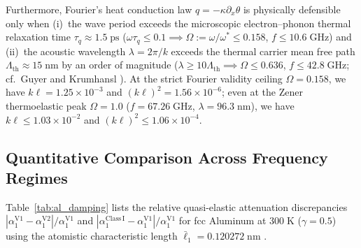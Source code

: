 Furthermore, Fourier's heat conduction law $q = -\kappa\partial_x\theta$ is physically defensible only when (i)~the wave period exceeds the microscopic electron--phonon thermal relaxation time $\tau_q \approx 1.5\;\mathrm{ps}$ ($\omega\tau_q \le 0.1 \implies \Omega := \omega/\omega^* \le 0.158$, $f \le 10.6\;\mathrm{GHz}$) and (ii)~the acoustic wavelength $\lambda = 2\pi/k$ exceeds the thermal carrier mean free path $\Lambda_{\mathrm{th}} \approx 15\;\mathrm{nm}$ by an order of magnitude ($\lambda \ge 10\Lambda_{\mathrm{th}} \implies \Omega \le 0.636$, $f \le 42.8\;\mathrm{GHz}$; cf.\ Guyer and Krumhansl \cite{GuyerKrumhansl1966}). At the strict Fourier validity ceiling $\Omega = 0.158$, we have $k\ell = 1.25 \times 10^{-3}$ and $(k\ell)^2 = 1.56 \times 10^{-6}$; even at the Zener thermoelastic peak $\Omega = 1.0$ ($f = 67.26\;\mathrm{GHz}$, $\lambda = 96.3\;\mathrm{nm}$), we have $k\ell \le 1.03 \times 10^{-2}$ and $(k\ell)^2 \le 1.06 \times 10^{-4}$.

\subsection{Quantitative Comparison Across Frequency Regimes}\label{subsec:quantitative_table}

Table~\ref{tab:al_damping} lists the relative quasi-elastic attenuation discrepancies $|\alpha_1^{\mathrm{V1}} - \alpha_1^{\mathrm{V2}}|/\alpha_1^{\mathrm{V1}}$ and $|\alpha_1^{\mathrm{Class\,I}} - \alpha_1^{\mathrm{V1}}|/\alpha_1^{\mathrm{V1}}$ for fcc Aluminum at $300\;\mathrm{K}$ ($\gamma = 0.5$) using the atomistic characteristic length $\bar{\ell}_1 = 0.120272\;\mathrm{nm}$ \cite{Lazar2022}.

